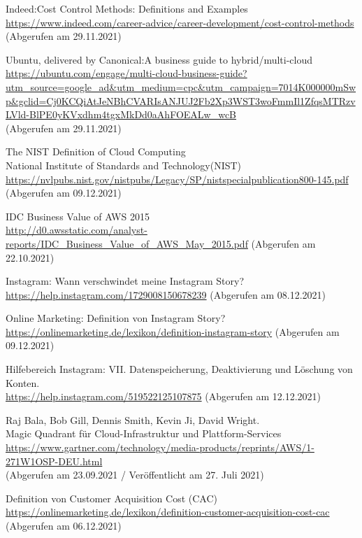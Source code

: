 \begin{thebibliography}{HR08}
 Indeed:Cost Control Methods: Definitions and Examples\\
\url{https://www.indeed.com/career-advice/career-development/cost-control-methods}\\
  (Abgerufen am 29.11.2021)

   Ubuntu, delivered by Canonical:A business guide to hybrid/multi-cloud\\
  \url{https://ubuntu.com/engage/multi-cloud-business-guide?utm_source=google_ad&utm_medium=cpc&utm_campaign=7014K000000mSwp&gclid=Cj0KCQiAtJeNBhCVARIsANJUJ2Fb2Xp3WST3woFmmIl1ZfqsMTRzvLVld-BlPE0yKVxdhm4tgxMkDd0aAhFOEALw_wcB}\\
  (Abgerufen am 29.11.2021)

  The NIST Definition of Cloud Computing\\
  National Institute of Standards and Technology(NIST)
  \url{https://nvlpubs.nist.gov/nistpubs/Legacy/SP/nistspecialpublication800-145.pdf}\\
  (Abgerufen am 09.12.2021)

   IDC Business Value of AWS 2015\\
 \url{http://d0.awsstatic.com/analyst-reports/IDC_Business_Value_of_AWS_May_2015.pdf}
 (Abgerufen am 22.10.2021)

   Instagram: Wann verschwindet meine Instagram Story?\\
 \url{https://help.instagram.com/1729008150678239}
 (Abgerufen am 08.12.2021)

  Online Marketing: Definition von Instagram Story?\\
 \url{https://onlinemarketing.de/lexikon/definition-instagram-story}
 (Abgerufen am 09.12.2021)
 
  Hilfebereich Instagram: VII. Datenspeicherung, Deaktivierung und Löschung von Konten.\\
 \url{https://help.instagram.com/519522125107875}
 (Abgerufen am 12.12.2021)
 
 Raj Bala, Bob Gill, Dennis Smith, Kevin Ji, David Wright.\\ 
  Magic Quadrant für Cloud-Infrastruktur und Plattform-Services\\
  \url{https://www.gartner.com/technology/media-products/reprints/AWS/1-271W1OSP-DEU.html}
  \\(Abgerufen am 23.09.2021 / Veröffentlicht am 27. Juli 2021)

 Definition von Customer Acquisition Cost (CAC)\\
 \url{https://onlinemarketing.de/lexikon/definition-customer-acquisition-cost-cac}
 (Abgerufen am 06.12.2021)


\end{thebibliography}
